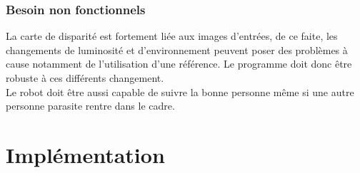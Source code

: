 \documentclass[12pt,a4paper]{report}
\begin{document}
\subsection{Besoin non fonctionnels}
	La carte de disparité est fortement liée aux images d'entrées, de ce faite, les changements de luminosité et d'environnement peuvent poser des problèmes à cause notamment de l'utilisation d'une référence.
	Le programme doit donc être robuste à ces différents changement.\\
	Le robot doit être aussi capable de suivre la bonne personne même si une autre personne parasite rentre dans le cadre.
	
\chapter{Implémentation}
\end{document}
